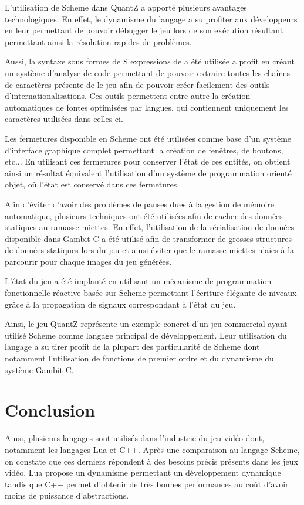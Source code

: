 \documentclass[12pt,oneside,letterpaper,francais]{book}
\begin{document}
L'utilisation de Scheme dans QuantZ a apporté plusieurs avantages
technologiques. En effet, le dynamisme du langage a su profiter aux
développeurs en leur permettant de pouvoir débugger le jeu lors de son
exécution résultant permettant ainsi la résolution rapides de
problèmes.

Aussi, la syntaxe sous formes de S expressions de a été utilisée a
profit en créant un système d'analyse de code permettant de pouvoir
extraire toutes les chaînes de caractères présente de le jeu afin de
pouvoir créer facilement des outils d'internationalisations. Ces
outils permettent entre autre la création automatiques de fontes
optimisées par langues, qui contiennent uniquement les caractères
utilisées dans celles-ci.

Les fermetures disponible en Scheme ont été utilisées comme base d'un
système d'interface graphique complet permettant la création de
fenêtres, de boutons, etc... En utilisant ces fermetures pour
conserver l'état de ces entités, on obtient ainsi un résultat
équivalent l'utilisation d'un système de programmation orienté objet,
où l'état est conservé dans ces fermetures.

Afin d'éviter d'avoir des problèmes de pauses dues à la gestion de
mémoire automatique, plusieurs techniques ont été utilisées afin de
cacher des données statiques au ramasse miettes. En effet,
l'utilisation de la sérialisation de données disponible dans Gambit-C
a été utilisé afin de transformer de grosses structures de données
statiques lors du jeu et ainsi éviter que le ramasse miettes n'aies à
la parcourir pour chaque images du jeu générées.

L'état du jeu a été implanté en utilisant un mécanisme de
programmation fonctionnelle réactive basée sur Scheme permettant
l'écriture élégante de niveaux grâce à la propagation de signaux
correspondant à l'état du jeu.

Ainsi, le jeu QuantZ représente un exemple concret d'un jeu commercial
ayant utilisé Scheme comme langage principal de développement. Leur
utilisation du langage a su tirer profit de la plupart des
particularité de Scheme dont notamment l'utilisation de fonctions de
premier ordre et du dynamisme du système Gambit-C.

\section{Conclusion}
Ainsi, plusieurs langages sont utilisés dans l'industrie du jeu vidéo
dont, notamment les langages Lua et C++. Après une comparaison au
langage Scheme, on constate que ces derniers répondent à des besoins
précis présents dans les jeux vidéo. Lua propose un dynamisme
permettant un développement dynamique tandis que C++ permet d'obtenir
de très bonnes performances au coût d'avoir moins de puissance
d'abstractions.
\end{document}
